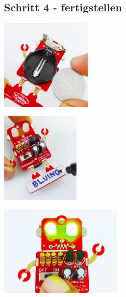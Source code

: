 \documentclass[a4paper]{article}
\begin{document}
\subsection{Schritt 4 - fertigstellen}
\begin{minipage}[t]{0.33\textwidth}
  \centering
  \includegraphics[height=4.5cm]{../pictures/Knopfzelle.jpg}
  \label{img:Knopfzelle}
  \end{minipage}
\begin{minipage}[t]{0.33\textwidth}
  \centering
  \includegraphics[height=4.5cm]{../pictures/Name.jpg}
  \label{img:Name}
\end{minipage}
\begin{minipage}[t]{0.33\textwidth}
  \centering
  \includegraphics[height=4.5cm]{../pictures/Switchon.jpg}
  \label{img:Switchon}
\end{minipage}
\ \\
\end{document}
